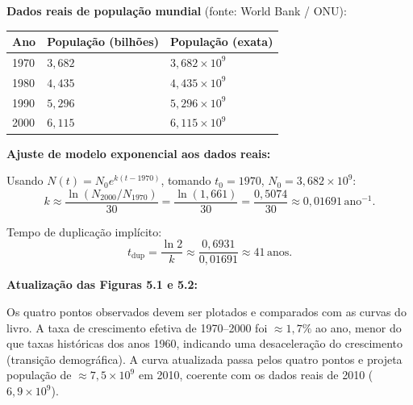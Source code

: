 \textbf{Dados reais de população mundial} (fonte: World Bank / ONU):

\begin{center}
\begin{tabular}{lll}
\hline
Ano & Populaç\~{a}o (bilh\~{o}es) & Populaç\~{a}o (exata)\\
\hline
1970 & $3{,}682$ & $3{,}682\times10^9$ \\
1980 & $4{,}435$ & $4{,}435\times10^9$ \\
1990 & $5{,}296$ & $5{,}296\times10^9$ \\
2000 & $6{,}115$ & $6{,}115\times10^9$ \\
\hline
\end{tabular}
\end{center}

\textbf{Ajuste de modelo exponencial aos dados reais:}

Usando $N(t)=N_0 e^{k(t-1970)}$, tomando $t_0=1970$, $N_0=3{,}682\times10^9$:
\[
k\approx\frac{\ln(N_{2000}/N_{1970})}{30}=\frac{\ln(1{,}661)}{30}=\frac{0{,}5074}{30}\approx0{,}01691\,\text{ano}^{-1}.
\]

Tempo de duplicaç\~{a}o implícito:
\[
t_{\text{dup}}=\frac{\ln 2}{k}\approx\frac{0{,}6931}{0{,}01691}\approx41\,\text{anos}.
\]

\textbf{Atualização das Figuras 5.1 e 5.2:}

Os quatro pontos observados devem ser plotados e comparados com as curvas do livro. A taxa de crescimento efetiva de 1970--2000 foi $\approx1{,}7\%$ ao ano, menor do que taxas históricas dos anos 1960, indicando uma desaceleração do crescimento (transiç\~{a}o demográfica). A curva atualizada passa pelos quatro pontos e projeta populaç\~{a}o de $\approx7{,}5\times10^9$ em 2010, coerente com os dados reais de 2010 ($6{,}9\times10^9$).